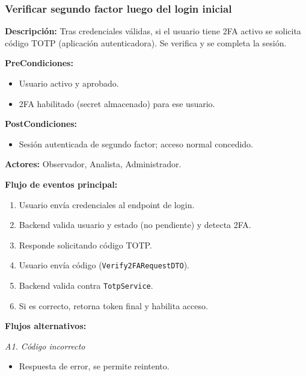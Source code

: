\subsubsection{Verificar segundo factor luego del login inicial}

\textbf{Descripción:} Tras credenciales válidas, si el usuario tiene 2FA activo se solicita código TOTP (aplicación autenticadora). Se verifica y se completa la sesión.

\vspace{0.5em}
\noindent\textbf{PreCondiciones:}
\begin{itemize}[nosep]
    \item Usuario activo y aprobado.
    \item 2FA habilitado (secret almacenado) para ese usuario.
\end{itemize}

\vspace{0.5em}
\noindent\textbf{PostCondiciones:}
\begin{itemize}[nosep]
    \item Sesión autenticada de segundo factor; acceso normal concedido.
\end{itemize}

\vspace{0.5em}
\noindent\textbf{Actores:} Observador, Analista, Administrador.

\vspace{0.5em}
\noindent\textbf{Flujo de eventos principal:}
\begin{enumerate}[nosep]
    \item Usuario envía credenciales al endpoint de login.
    \item Backend valida usuario y estado (no pendiente) y detecta 2FA.
    \item Responde solicitando código TOTP.
    \item Usuario envía código (\texttt{Verify2FARequestDTO}).
    \item Backend valida contra \texttt{TotpService}.
    \item Si es correcto, retorna token final y habilita acceso.
\end{enumerate}

\vspace{0.5em}
\noindent\textbf{Flujos alternativos:}

\vspace{0.3em}
\noindent\textit{A1. Código incorrecto}
\begin{itemize}[nosep]
    \item Respuesta de error, se permite reintento.
\end{itemize}

